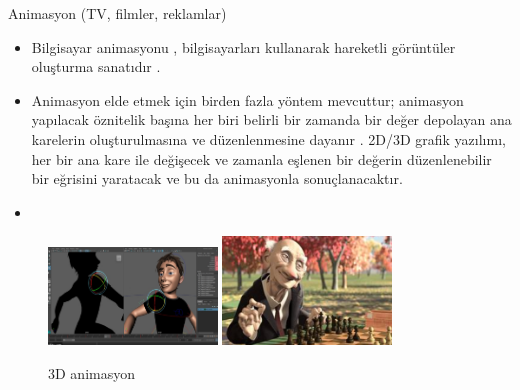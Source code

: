 \documentclass{beamer}
\begin{document}
\begin{frame}{Animasyon (TV, filmler, reklamlar)}
\begin{itemize}
    \item Bilgisayar animasyonu , bilgisayarları kullanarak hareketli görüntüler oluşturma sanatıdır .
    \item Animasyon elde etmek için birden fazla yöntem mevcuttur; animasyon yapılacak öznitelik başına her biri belirli bir zamanda bir değer depolayan ana karelerin oluşturulmasına ve düzenlenmesine dayanır . 2D/3D grafik yazılımı, her bir ana kare ile değişecek ve zamanla eşlenen bir değerin düzenlenebilir bir eğrisini yaratacak ve bu da animasyonla sonuçlanacaktır.\cite{omercetin}
    \item 
\end{itemize}

\begin{figure}
\includegraphics[width=0.4\textwidth]{animasyon.PNG}
\includegraphics[width=0.4\textwidth]{animasyon2.PNG}
\caption{3D animasyon}
\end{figure}
    
\end{frame}
\end{document}
